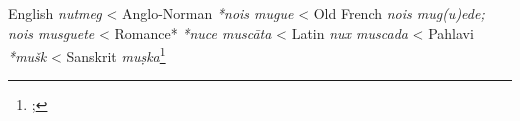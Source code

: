 \begin{etymology}\label{ety:nutmeg}
English \textit{nutmeg}
< Anglo-Norman \textit{*nois mugue}
< Old French \textit{nois mug(u)ede; nois musguete}
< Romance* \textit{*nuce muscāta}
< Latin \textit{nux muscada}
< Pahlavi \textit{*mušk}
< Sanskrit \textit{muṣka}\footnote{; }
\end{etymology}